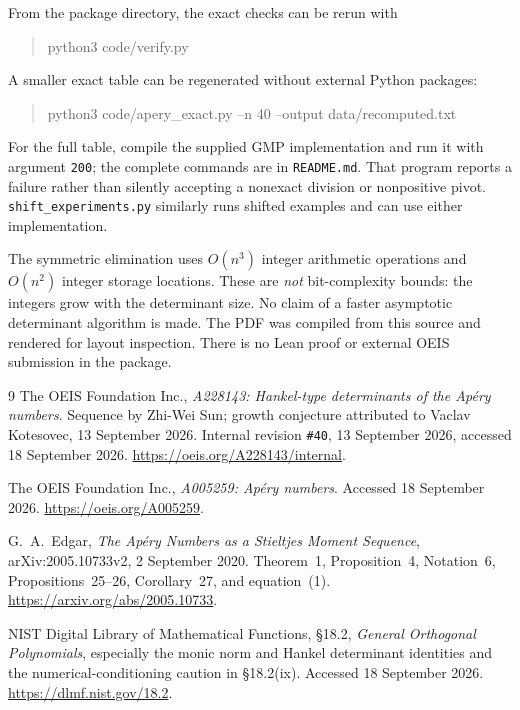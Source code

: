 \documentclass[11pt,a4paper]{article}
\numberwithin{equation}{section}
\theoremstyle{remark}\newtheorem{remark}[theorem]{Remark}
\begin{document}
From the package directory, the exact checks can be rerun with
\begin{quote}\small\ttfamily
python3 code/verify.py
\end{quote}
A smaller exact table can be regenerated without external Python packages:
\begin{quote}\small\ttfamily
python3 code/apery\_exact.py --n 40 --output data/recomputed.txt
\end{quote}
For the full table, compile the supplied GMP implementation and run it with
argument \texttt{200}; the complete commands are in \texttt{README.md}.
That program reports a failure rather than silently accepting a nonexact
division or nonpositive pivot. \texttt{shift\_experiments.py} similarly runs
shifted examples and can use either implementation.

The symmetric elimination uses $O(n^3)$ integer arithmetic operations and
$O(n^2)$ integer storage locations. These are \emph{not} bit-complexity bounds:
the integers grow with the determinant size. No claim of a faster asymptotic
determinant algorithm is made. The PDF was compiled from this source and
rendered for layout inspection. There is no Lean proof or external OEIS
submission in the package.

\begin{thebibliography}{9}
The OEIS Foundation Inc., \emph{A228143: Hankel-type determinants of the
Ap\'ery numbers}. Sequence by Zhi-Wei Sun; growth conjecture attributed to
Vaclav Kotesovec, 13 September 2026. Internal revision \texttt{\#40},
13 September 2026, accessed 18 September 2026.
\url{https://oeis.org/A228143/internal}.

The OEIS Foundation Inc., \emph{A005259: Ap\'ery numbers}.
Accessed 18 September 2026.
\url{https://oeis.org/A005259}.

G.~A.~Edgar, \emph{The Ap\'ery Numbers as a Stieltjes Moment Sequence},
arXiv:2005.10733v2, 2 September 2020.
Theorem~1, Proposition~4, Notation~6, Propositions~25--26, Corollary~27,
and equation~(1).
\url{https://arxiv.org/abs/2005.10733}.

NIST Digital Library of Mathematical Functions, \S18.2,
\emph{General Orthogonal Polynomials}, especially the monic norm and Hankel
determinant identities and the numerical-conditioning caution in \S18.2(ix).
Accessed 18 September 2026.
\url{https://dlmf.nist.gov/18.2}.
\end{thebibliography}
\end{document}
